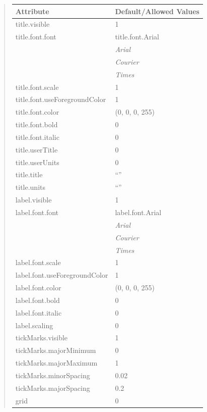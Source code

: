 \documentclass[letterpaper,10pt,english]{sphinxmanual}
\begin{document}
\begin{quote}
\begin{longtable}{|l|l|}
\textbf{Attribute}
 & 
\textbf{Default/Allowed Values}
\\
\hline
title.visible
 & 
1
\\
\hline
title.font.font
 & 
title.font.Arial
\\
\hline & 
\emph{Arial}
\\
\hline & 
\emph{Courier}
\\
\hline & 
\emph{Times}
\\
\hline
title.font.scale
 & 
1
\\
\hline
title.font.useForegroundColor
 & 
1
\\
\hline
title.font.color
 & 
(0, 0, 0, 255)
\\
\hline
title.font.bold
 & 
0
\\
\hline
title.font.italic
 & 
0
\\
\hline
title.userTitle
 & 
0
\\
\hline
title.userUnits
 & 
0
\\
\hline
title.title
 & 
``''
\\
\hline
title.units
 & 
``''
\\
\hline
label.visible
 & 
1
\\
\hline
label.font.font
 & 
label.font.Arial
\\
\hline & 
\emph{Arial}
\\
\hline & 
\emph{Courier}
\\
\hline & 
\emph{Times}
\\
\hline
label.font.scale
 & 
1
\\
\hline
label.font.useForegroundColor
 & 
1
\\
\hline
label.font.color
 & 
(0, 0, 0, 255)
\\
\hline
label.font.bold
 & 
0
\\
\hline
label.font.italic
 & 
0
\\
\hline
label.scaling
 & 
0
\\
\hline
tickMarks.visible
 & 
1
\\
\hline
tickMarks.majorMinimum
 & 
0
\\
\hline
tickMarks.majorMaximum
 & 
1
\\
\hline
tickMarks.minorSpacing
 & 
0.02
\\
\hline
tickMarks.majorSpacing
 & 
0.2
\\
\hline
grid
 & 
0
\\
\hline\end{longtable}

\end{quote}
\end{document}
